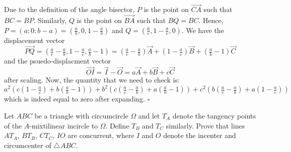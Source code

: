 \documentclass{article}
\begin{document}
Due to the definition of the angle bisector, $P$ is the point on $\overrightarrow{CA}$ such that $BC = BP$. Similarly, $Q$ is the point on $\overrightarrow{BA}$ such that $BQ = BC$. Hence, $P = (a : 0 : b-a) = \left(\tfrac{a}{b}, 0, 1-\tfrac{a}{b}\right)$ and $Q = \left(\frac{a}{c}, 1-\tfrac{a}{c}, 0\right)$. We have the displacement vector \[\overrightarrow{PQ} = \left(\tfrac{a}{c}-\tfrac{a}{b}, 1-\tfrac{a}{c}, \tfrac{a}{b}-1\right) = \left(\tfrac{a}{c}-\tfrac{a}{b}\right)\overrightarrow{A}+\left(1-\tfrac{a}{c}\right)\overrightarrow{B}+\left(\tfrac{a}{b}-1\right)\overrightarrow{C}\] and the psuedo-displacment vector \[\overrightarrow{OI} = \overrightarrow{I}-\overrightarrow{O} = a\overrightarrow{A}+b\overrightarrow{B}+c\overrightarrow{C}\] after scaling. Now, the quantity that we need to check is: \[a^2\left(c\left(1-\tfrac{a}{c}\right)+b\left(\tfrac{a}{b}-1\right)\right)+b^2\left(c\left(\tfrac{a}{c}-\tfrac{a}{b}\right)+a\left(\tfrac{a}{b}-1\right)\right)+c^2\left(b\left(\tfrac{a}{c}-\tfrac{a}{b}\right)+a\left(1-\tfrac{a}{c}\right)\right)\] which is indeed equal to zero after expanding. $\square$

\begin{problem}[7.42]{}
Let $ABC$ be a triangle with circumcircle $\Omega$ and let $T_A$ denote the tangency points of the $A$-mixtilinear incircle to $\Omega$. Define $T_B$ and $T_C$ similarly. Prove that lines $AT_A$, $BT_B$, $CT_C$, $IO$ are concurrent, where $I$ and $O$ denote the incenter and circumcenter of $\triangle ABC$. 
\end{problem}
\end{document}
